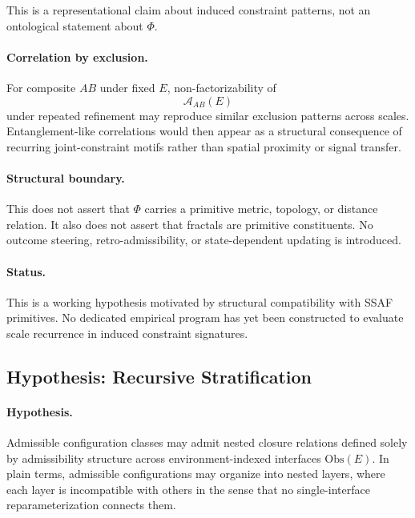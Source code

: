\documentclass[aps,prx,onecolumn,11pt]{revtex4-2}
\theoremstyle{plain}
\theoremstyle{definition}
\theoremstyle{remark}
\begin{document}
This is a representational claim about induced constraint patterns,
not an ontological statement about \(\Phi\).

\paragraph{Correlation by exclusion.}

For composite \(AB\) under fixed \(E\), non-factorizability of
\[
\mathcal A_{AB}(E)
\]
under repeated refinement may reproduce similar exclusion patterns
across scales. Entanglement-like correlations would then appear as a
structural consequence of recurring joint-constraint motifs rather than
spatial proximity or signal transfer.

\paragraph{Structural boundary.}

This does not assert that \(\Phi\) carries a primitive metric, topology,
or distance relation. It also does not assert that fractals are
primitive constituents. No outcome steering, retro-admissibility, or
state-dependent updating is introduced.

\paragraph{Status.}

This is a working hypothesis motivated by structural compatibility with
SSAF primitives. No dedicated empirical program has yet been constructed
to evaluate scale recurrence in induced constraint signatures.

\subsection{Hypothesis: Recursive Stratification}
\label{subsec:hyp_recursive_stratification}

\paragraph{Hypothesis.}

Admissible configuration classes may admit nested closure relations
defined solely by admissibility structure across environment-indexed
interfaces \(\mathrm{Obs}(E)\). In plain terms, admissible
configurations may organize into nested layers, where each layer is
incompatible with others in the sense that no single-interface
reparameterization connects them.
\end{document}
